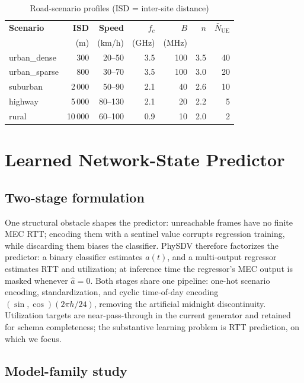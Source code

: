 \documentclass[10pt,conference]{IEEEtran}
\begin{document}
\begin{table}[t]
\centering
\caption{Road-scenario profiles (ISD = inter-site distance)}
\label{tab:scenarios}
\scriptsize\setlength{\tabcolsep}{3.6pt}
\begin{tabular}{@{}lrrrrrr@{}}
\toprule
\textbf{Scenario} & \textbf{ISD} & \textbf{Speed} & $f_c$ & $B$ &
$n$ & $\bar N_{\mathrm{UE}}$ \\
 & (m) & (km/h) & (GHz) & (MHz) & & \\
\midrule
urban\_dense  &    300 & 20--50   & 3.5 & 100 & 3.5 & 40 \\
urban\_sparse &    800 & 30--70   & 3.5 & 100 & 3.0 & 20 \\
suburban      &  2\,000 & 50--90  & 2.1 &  40 & 2.6 & 10 \\
highway       &  5\,000 & 80--130 & 2.1 &  20 & 2.2 &  5 \\
rural         & 10\,000 & 60--100 & 0.9 &  10 & 2.0 &  2 \\
\bottomrule
\end{tabular}
\end{table}

\section{Learned Network-State Predictor}\label{sec:predictor}

\subsection{Two-stage formulation}

One structural obstacle shapes the predictor: unreachable frames have
no finite MEC RTT; encoding them with a sentinel value corrupts
regression training, while discarding them biases the classifier.  PhySDV therefore factorizes the predictor:
a binary classifier estimates $\hat a(t)$, and a multi-output regressor
estimates RTT and utilization; at inference time the regressor's MEC
output is masked whenever $\hat a = 0$.  Both stages share one
pipeline: one-hot scenario encoding, standardization, and cyclic
time-of-day encoding $(\sin, \cos)(2\pi h / 24)$, removing the
artificial midnight discontinuity.  Utilization targets are near-pass-through in the current generator and
retained for schema completeness; the substantive learning problem is
RTT prediction, on which we focus.

\subsection{Model-family study}
\end{document}
